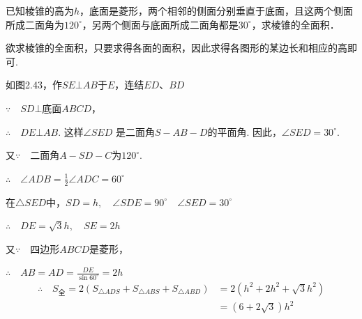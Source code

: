 \noindent
\begin{minipage}{.62\textwidth}\CTEXindent
\begin{example}
已知棱锥的高为$h$，底面是菱形，两个相邻的侧面分别垂直于底面，且这两个侧面所成二面角为$120^{\circ}$，另两个侧面与底面所成二面角都是$30^{\circ}$，求棱锥的全面积．
\end{example}

\begin{analyze}
    欲求棱锥的全面积，只要求得各面的面积，因此求得各图形的某边长和相应的高即可. 
\end{analyze}
\end{minipage}
\hfill
\begin{minipage}{.35\textwidth}
\centering
{}
\end{minipage}

\begin{solution}
如图2.43，作$SE\bot AB$于$E$，连结$ED$、$BD$

$\because\quad SD\bot $底面$ABCD$，

$\therefore\quad DE\bot AB$. 这样$\angle SED$
是二面角$S-AB-D$的平面角. 因此，$\angle SED=30^{\circ}$.

又$\because\quad$二面角$A-SD-C$为$120^{\circ}$.

$\therefore\quad \angle ADB=\frac{1}{2}\angle ADC=60^{\circ}$

在$\triangle SED$中，$SD=h,\quad \angle SDE=90^{\circ}\quad \angle SED=30^{\circ}$

$\therefore\quad DE=\sqrt{3}h,\quad SE=2h$

又$\because\quad $四边形$ABCD$是菱形，

$\therefore\quad AB=AD=\frac{DE}{\sin60^{\circ}}=2h$
\[\begin{split}
    \therefore\quad S_{\text{全}}=2\left(S_{\triangle ADS}+S_{\triangle ABS}+S_{\triangle ABD}\right)
    &=2\left(h^2+2h^2+\sqrt{3}h^2\right)\\&=\left(6+2\sqrt{3}\right)h^2
\end{split}\]
\end{solution}

